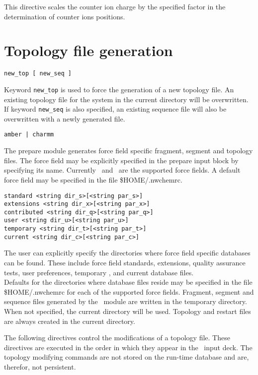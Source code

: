 This directive scales the counter ion charge by the specified factor
in the determination of counter ions positions.

\section{Topology file generation}

\begin{verbatim}
new_top [ new_seq ]
\end{verbatim}

Keyword \verb+new_top+ is used to force the generation of a new topology 
file. An existing topology file for the system in the current directory
will be overwritten. If keyword \verb+new_seq+ is also specified, an
existing sequence file will also be overwritten with a newly generated
file.

\begin{verbatim}
amber | charmm
\end{verbatim}

The prepare module generates force field specific fragment, segment and 
topology files. The force field may be explicitly specified in the prepare 
input block by specifying its name.
Currently \amber\ and \charmm\ are the supported force fields.
A default force field may be specified in the file \$HOME/.nwchemrc. 

\begin{verbatim}
standard <string dir_s>[<string par_s>]
extensions <string dir_x>[<string par_x>]
contributed <string dir_q>[<string par_q>]
user <string dir_u>[<string par_u>]
temporary <string dir_t>[<string par_t>]
current <string dir_c>[<string par_c>]
\end{verbatim}

The user can explicitly specify the directories where force field
specific databases can be found. These include force field standards,
extensions, quality assurance tests, user preferences, temporary , and
current database files.\\
Defaults for the directories where database files reside may be specified 
in the file \$HOME/.nwchemrc for each of the supported force fields. 
Fragment, segment and sequence files generated by the \prepare\ module are 
written in the temporary directory. When not specified, the current 
directory will be used. 
Topology and restart files are always created in the current directory.


The following directives control the modifications of a
topology file. These directives are executed in the order in which 
they appear in the \prepare\ input deck. The topology modifying
commands are not stored on the run-time database and are, therefor,
not persistent.

